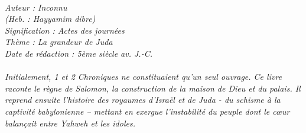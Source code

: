 \BFont
\noindent\hrulefill
{\footnotesize
\textit{
\bigskip
{\centering{}
\\Auteur : Inconnu
\\(Heb. : Hayyamim dibre)
\\Signification : Actes des journées
\\Thème : La grandeur de Juda
\\Date de rédaction : 5ème siècle av. J.-C.\\}
}
\textit{
\\Initialement, 1 et 2 Chroniques ne constituaient qu'un seul ouvrage. Ce livre raconte le règne de Salomon, la construction de la maison de Dieu et du palais. Il reprend ensuite l'histoire des royaumes d'Israël et de Juda - du schisme à la captivité babylonienne – mettant en exergue l'instabilité du peuple dont le cœur balançait entre Yahweh et les idoles.\bigskip
}
}
\par\nobreak\noindent\hrulefill
